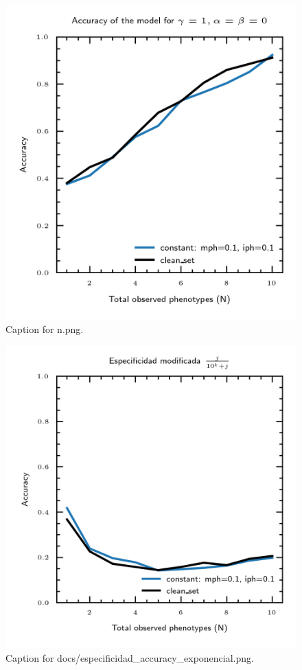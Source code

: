 \documentclass{article}
\begin{document}
\begin{figure}[h] \centering \includegraphics{n.png} \caption{Caption for n.png.} \end{figure}
\begin{figure}[h] \centering \includegraphics{docs/especificidad_accuracy_exponencial.png} \caption{Caption for docs/especificidad_accuracy_exponencial.png.} \end{figure}
\end{document}
